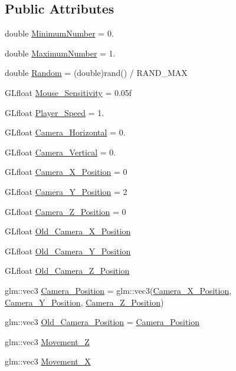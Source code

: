\subsection*{Public Attributes}
\begin{DoxyCompactItemize}
\item 
double \hyperlink{class_game_world_a54ccf4cf03172ab8779e9c326c8846ed}{Minimum\+Number} = 0.
\item 
double \hyperlink{class_game_world_a1cddcf233625a98581eaeb9fd7c8c574}{Maximum\+Number} = 1.
\item 
double \hyperlink{class_game_world_a56652cc9880b3ba1be61395066c863c3}{Random} = (double)rand() / R\+A\+N\+D\+\_\+\+M\+A\+X
\item 
G\+Lfloat \hyperlink{class_game_world_a9bf4eb977e6ab9299aaef1345c4fa4dd}{Mouse\+\_\+\+Sensitivity} = 0.\+05f
\item 
G\+Lfloat \hyperlink{class_game_world_ae8ab2ac372729cec44ea316f6bdf45ca}{Player\+\_\+\+Speed} = 1.
\item 
G\+Lfloat \hyperlink{class_game_world_a7f4911dda9b3b4e4eb03ece87e16cd96}{Camera\+\_\+\+Horizontal} = 0.
\item 
G\+Lfloat \hyperlink{class_game_world_a26658e739c4d267b1be35ed820089931}{Camera\+\_\+\+Vertical} = 0.
\item 
G\+Lfloat \hyperlink{class_game_world_ad07b1f650edb08ddb05e74a22588bda0}{Camera\+\_\+\+X\+\_\+\+Position} = 0
\item 
G\+Lfloat \hyperlink{class_game_world_ae3e7cab30494ff5a8e91dfa7406deb16}{Camera\+\_\+\+Y\+\_\+\+Position} = 2
\item 
G\+Lfloat \hyperlink{class_game_world_ad993ea24fbacfc98410894078e916927}{Camera\+\_\+\+Z\+\_\+\+Position} = 0
\item 
G\+Lfloat \hyperlink{class_game_world_a734c19bd480aef2a7af005e170d3d523}{Old\+\_\+\+Camera\+\_\+\+X\+\_\+\+Position}
\item 
G\+Lfloat \hyperlink{class_game_world_ac1c9de2db7cb175f7a039a9f825190fc}{Old\+\_\+\+Camera\+\_\+\+Y\+\_\+\+Position}
\item 
G\+Lfloat \hyperlink{class_game_world_acf69fc81410f4bb31d03b7551eb0bced}{Old\+\_\+\+Camera\+\_\+\+Z\+\_\+\+Position}
\item 
glm\+::vec3 \hyperlink{class_game_world_ad80e597474ea4c52a583e81788187571}{Camera\+\_\+\+Position} = glm\+::vec3(\hyperlink{class_game_world_ad07b1f650edb08ddb05e74a22588bda0}{Camera\+\_\+\+X\+\_\+\+Position}, \hyperlink{class_game_world_ae3e7cab30494ff5a8e91dfa7406deb16}{Camera\+\_\+\+Y\+\_\+\+Position}, \hyperlink{class_game_world_ad993ea24fbacfc98410894078e916927}{Camera\+\_\+\+Z\+\_\+\+Position})
\item 
glm\+::vec3 \hyperlink{class_game_world_ade0aa1baaba6ac54674638cef313c0bb}{Old\+\_\+\+Camera\+\_\+\+Position} = \hyperlink{class_game_world_ad80e597474ea4c52a583e81788187571}{Camera\+\_\+\+Position}
\item 
glm\+::vec3 \hyperlink{class_game_world_a8dd30ba92e7fa9b9b05075e31d1e7dd8}{Movement\+\_\+\+Z}
\item 
glm\+::vec3 \hyperlink{class_game_world_a968eb29424b68f7cd79a5896c62e944d}{Movement\+\_\+\+X}
\end{DoxyCompactItemize}


